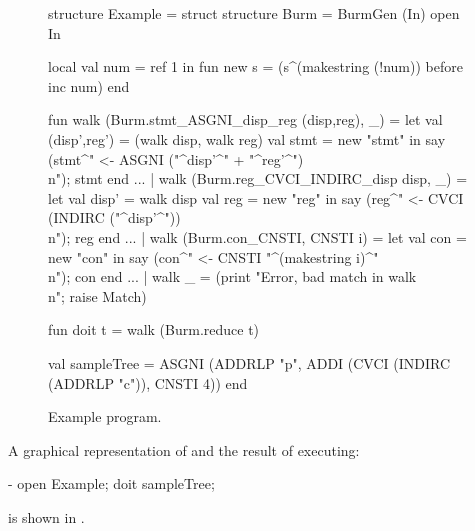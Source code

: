 \documentclass[11pt]{article}
\begin{document}
\begin{figure}
\begin{centercode}
structure Example = struct 
  structure Burm = BurmGen (In)
  open In

  local val num = ref 1 in
    fun new s = (s^(makestring (!num)) before inc num)
  end

  fun walk (Burm.stmt_ASGNI_disp_reg (disp,reg), _) =
        let
          val (disp',reg') = (walk disp, walk reg)
          val stmt = new "stmt"
        in
          say (stmt^" <- ASGNI ("^disp'^" + "^reg'^")\\n"); stmt
        end
    ...
    | walk (Burm.reg_CVCI_INDIRC_disp disp, _) =
	let
	  val disp' = walk disp
	  val reg = new "reg"
	in
	  say (reg^" <- CVCI (INDIRC ("^disp'^"))\\n"); reg
	end
    ...
    | walk (Burm.con_CNSTI, CNSTI i) =
        let
          val con = new "con"
        in
          say (con^" <- CNSTI "^(makestring i)^"\\n"); con
        end
    ...
    | walk _ = (print "Error, bad match in walk\\n"; raise Match)


  fun doit t = walk (Burm.reduce t)

  val sampleTree = ASGNI (ADDRLP "p",
                          ADDI (CVCI (INDIRC (ADDRLP "c")),
                                CNSTI 4))
end
\end{centercode}
 \caption{Example program.}
 \label{ex:prog}
\end{figure}

A graphical representation of  and the result of
executing: 
\begin{code}
    - open Example; doit sampleTree;
\end{code}
is shown in .
\end{document}
